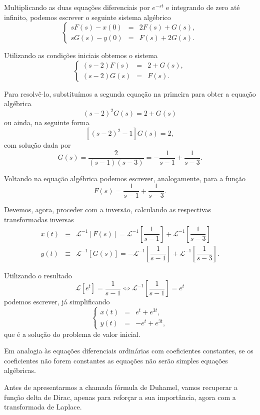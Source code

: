 Multiplicando as duas equações diferenciais por $e^{-st}$ e integrando de zero até infinito, podemos escrever o seguinte sistema algébrico
$$\left\{\begin{array}{rcl}
sF(s) - x(0) &=& 2F(s) + G(s), \\
sG(s) - y(0) &=& F(s) + 2G(s).
\end{array}\right.$$

Utilizando as condições iniciais obtemos o sistema
$$\left\{\begin{array}{rcl}
(s - 2)F(s) &=& 2 + G(s), \\
(s - 2)G(s) &=& F(s).
\end{array}\right.$$

Para resolvê-lo, substituímos a segunda equação na primeira para obter a equação algébrica
$$(s - 2)^{2}G(s) = 2 + G(s)$$
ou ainda, na seguinte forma
$$[(s - 2)^{2} - 1]G(s) = 2,$$
com solução dada por
$$
G(s) =
\dfrac{2}{(s - 1)(s - 3)}
=
-
\dfrac{1}{s - 1}
+
\dfrac{1}{s - 3}.
$$

Voltando na equação algébrica podemos escrever, analogamente, para a função
$$F(s) =
\dfrac{1}{s - 1}
+
\dfrac{1}{s - 3}.$$

Devemos, agora, proceder com a inversão, calculando as respectivas transformadas inversas
$$\begin{array}{rcl}
x(t) &\equiv& \mathscr{L}^{-1}[F(s)] = \mathscr{L}^{-1}
\left[
\dfrac{1}{s - 1}
\right]
+
\mathscr{L}^{-1}
\left[
\dfrac{1}{s - 3}
\right] \\[0.5cm]
y(t)
&\equiv& \mathscr{L}^{-1}[G(s)] =
-\mathscr{L}^{-1}
\left[
\dfrac{1}{s - 1}
\right]
+
\mathscr{L}^{-1}
\left[
\dfrac{1}{s - 3}
\right].
\end{array}$$

Utilizando o resultado
$$\mathscr{L}[e^{t}] =
\dfrac{1}{s - 1}
\Leftrightarrow
\mathscr{L}^{-1}
\left[
\dfrac{1}{s - 1}
\right]
= e^{t}$$
podemos escrever, já simplificando
$$\left\{\begin{array}{rcl}
x(t) &=& e^{t} + e^{3t}, \\
y(t) &=& -e^{t} + e^{3t},
\end{array}\right.$$
que é a solução do problema de valor inicial.

Em analogia às equações diferenciais ordinárias com coeficientes constantes, se os coeficientes não forem constantes as equações não serão simples equações algébricas.

Antes de apresentarmos a chamada fórmula de Duhamel, vamos recuperar a função delta de Dirac, apenas para reforçar a sua importância, agora com a transformada
de Laplace.

